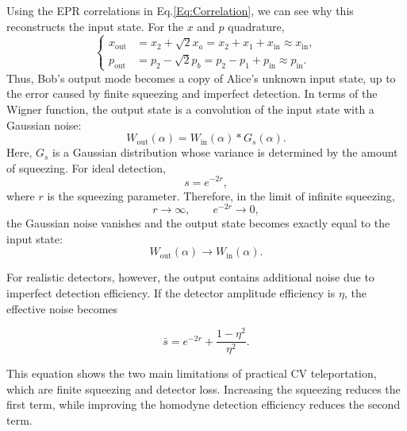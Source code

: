 \documentclass[aps,prd,preprint,floats,epsf,superscriptaddress,nofootinbib]{revtex4}
\begin{document}
Using the EPR correlations in Eq.\ref{Eq:Correlation}, 
we can see why this reconstructs the input state. For the $x$ and $p$ quadrature,
\begin{equation}
\left\{
\begin{aligned}
x_{\text{out}}
&= x_2 + \sqrt{2}x_a
 = x_2 + x_1 + x_{\text{in}}
 \approx x_{\text{in}}, \\[4pt]
p_{\text{out}}
&= p_2 - \sqrt{2}p_b
 = p_2 - p_1 + p_{\text{in}}
 \approx p_{\text{in}}.
\end{aligned}
\right.
\end{equation}
Thus, Bob's output mode becomes a copy of Alice's unknown input state, up to the error caused by finite squeezing and imperfect detection.
In terms of the Wigner function, the output state is a convolution of the input state with a Gaussian noise:
\begin{equation}
    W_{\text{out}}(\alpha)
    =
    W_{\text{in}}(\alpha) * G_s(\alpha).
\end{equation}
Here, $G_s$ is a Gaussian distribution whose variance is determined by the amount of squeezing. For ideal detection,
\begin{equation}
    s = e^{-2r},
\end{equation}
where $r$ is the squeezing parameter. Therefore, in the limit of infinite squeezing,
\begin{equation}
    r \rightarrow \infty,
    \qquad
    e^{-2r} \rightarrow 0,
\end{equation}
the Gaussian noise vanishes and the output state becomes exactly equal to the input state:
\begin{equation}
    W_{\text{out}}(\alpha) \rightarrow W_{\text{in}}(\alpha).
\end{equation}

For realistic detectors, however, the output contains additional noise due to imperfect detection efficiency. If the detector amplitude efficiency is $\eta$, the effective noise becomes

\begin{equation}
    \bar{s}
    =
    e^{-2r}
    +
    \frac{1-\eta^2}{\eta^2}.
\end{equation}

This equation shows the two main limitations of practical CV teleportation, which are finite squeezing and detector loss. 
Increasing the squeezing reduces the first term, while improving the homodyne detection efficiency reduces the second term.
\end{document}
